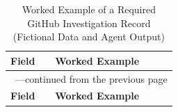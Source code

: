 \documentclass[12pt,letterpaper]{article}
\begin{document}
\begin{longtable}{|p{}|p{}|}
    \caption{Worked Example of a Required GitHub Investigation Record (Fictional Data and Agent Output)}
    \label{tab:worked-test-record}                                                                                                                                                                                                                                                                                                                                                                                                                                                                                                                                                                                                            \\
    \hline
    \textbf{Field}                  & \textbf{Worked Example}                                                                                                                                                                                                                                                                                                                                                                                                                                                                                                                                                                                 \\
    \hline
    \endfirsthead
    \multicolumn{2}{c}{\tablename\ \thetable{}---continued from the previous page}                                                                                                                                                                                                                                                                                                                                                                                                                                                                                                                                                            \\
    \hline
    \textbf{Field}                  & \textbf{Worked Example}                                                                                                                                                                                                                                                                                                                                                                                                                                                                                                                                                                                 \\

\end{longtable}
\end{document}
